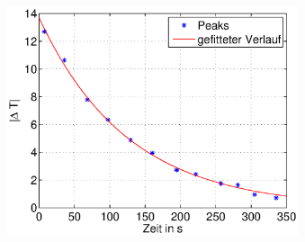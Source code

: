 \begin{frame}
\begin{columns}[c]
\begin{figure}[H]
\begin{center}
            \end{center}
            \end{figure}
            \begin{figure}[H]
            \begin{center}
                    \includegraphics[scale=0.3]{./img/plots/2_c_100_Peaks_wind.eps}
            \end{center}
            \end{figure}
    \end{columns}
\end{frame}
